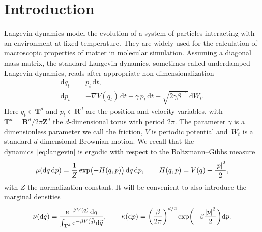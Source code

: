 \documentclass[11pt,a4paper]{article}
\newcommand{\e}{\mathrm{e}}
\newcommand{\real}{\mathbf R}
\newcommand{\integer}{\mathbf Z}
\newcommand{\torus}{\mathbf T}
\newcommand{\grad}{\nabla}
\renewcommand{\d}{\mathrm d}
\theoremstyle{plain}
\numberwithin{equation}{section}
\begin{document}
\section{Introduction}%
Langevin dynamics model the evolution of a system of particles interacting with an environment at fixed temperature.
They are widely used for the calculation of macroscopic properties of matter in molecular simulation.
Assuming a diagonal mass matrix,
the standard Langevin dynamics, sometimes called underdamped Langevin dynamics,
reads after appropriate non-dimensionalization~\cite[Section 2.2.4]{MR2681239}
\begin{subequations}
\label{eq:langevin}
\begin{align}
    \label{eq:langevin_q}
    \d q_t &= p_t \, \d t, \\
    \label{eq:langevin_p}
    \d p_t &= - \grad V(q_t) \, \d t - \gamma \, p_t \, \d t + \sqrt{2 \gamma \beta^{-1}} \, \d W_t.
\end{align}
\end{subequations}
Here $q_t \in \torus^d$ and $p_t \in \real^d$ are the position and velocity variables,
with~$\torus^d = \real^d / 2\pi \integer^d$ the $d$-dimensional torus with period $2 \pi$.
The parameter $\gamma$ is a dimensionless parameter we call the friction,
$V$ is periodic potential
and~$W_t$ is a standard $d$-dimensional Brownian motion.
We recall that the dynamics~\eqref{eq:langevin} is ergodic with respect to the Boltzmann--Gibbs measure
\begin{equation}
    \label{eq:invariant_measure}
    \mu(\d q \, \d p) = \frac{1}{Z} \exp \bigl( - H(q, p)  \bigr) \, \d q \, \d p,
    \qquad H(q, p) = V(q) + \frac{\abs{p}^2}{2},
\end{equation}
with $Z$ the normalization constant.
It will be convenient to also introduce the marginal densities
\begin{equation}
    \label{eq:definition_prob_measures}
    \nu(\d q) = \frac{\e^{- \beta V(q)} \, \d q}{\int_{\torus^d}\e^{-\beta V(\widetilde q)} \d \widetilde q},
    \qquad \kappa(\d p) = \left( \frac{\beta}{2 \pi} \right)^{d/2}\exp \biggl( - \beta \frac{\abs*{p}^2}{2} \biggr) \d p.
\end{equation}
\end{document}
